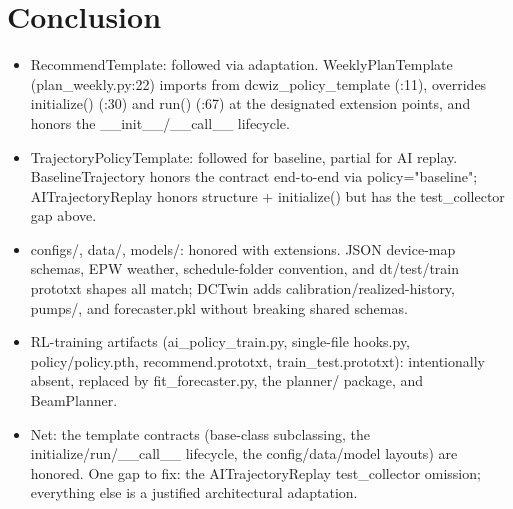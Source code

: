 \documentclass[10pt]{article}
\begin{document}
\section*{Conclusion}
\begin{itemize}
\item RecommendTemplate: followed via adaptation. WeeklyPlanTemplate (plan\_\allowbreak{}weekly.py:22) imports from dcwiz\_\allowbreak{}policy\_\allowbreak{}template (:11), overrides initialize() (:30) and run() (:67) at the designated extension points, and honors the \_\allowbreak{}\_\allowbreak{}init\_\allowbreak{}\_\allowbreak{}/\allowbreak{}\_\allowbreak{}\_\allowbreak{}call\_\allowbreak{}\_\allowbreak{} lifecycle.
\item TrajectoryPolicyTemplate: followed for baseline, partial for AI replay. BaselineTrajectory honors the contract end-to-end via policy="baseline"; AITrajectoryReplay honors structure + initialize() but has the test\_\allowbreak{}collector gap above.
\item configs/\allowbreak{}, data/\allowbreak{}, models/\allowbreak{}: honored with extensions. JSON device-map schemas, EPW weather, schedule-folder convention, and dt/\allowbreak{}test/\allowbreak{}train prototxt shapes all match; DCTwin adds calibration/\allowbreak{}realized-history, pumps/\allowbreak{}, and forecaster.pkl without breaking shared schemas.
\item RL-training artifacts (ai\_\allowbreak{}policy\_\allowbreak{}train.py, single-file hooks.py, policy/\allowbreak{}policy.pth, recommend.prototxt, train\_\allowbreak{}test.prototxt): intentionally absent, replaced by fit\_\allowbreak{}forecaster.py, the planner/\allowbreak{} package, and BeamPlanner.
\item Net: the template contracts (base-class subclassing, the initialize/\allowbreak{}run/\allowbreak{}\_\allowbreak{}\_\allowbreak{}call\_\allowbreak{}\_\allowbreak{} lifecycle, the config/\allowbreak{}data/\allowbreak{}model layouts) are honored. One gap to fix: the AITrajectoryReplay test\_\allowbreak{}collector omission; everything else is a justified architectural adaptation.
\end{itemize}
\end{document}

